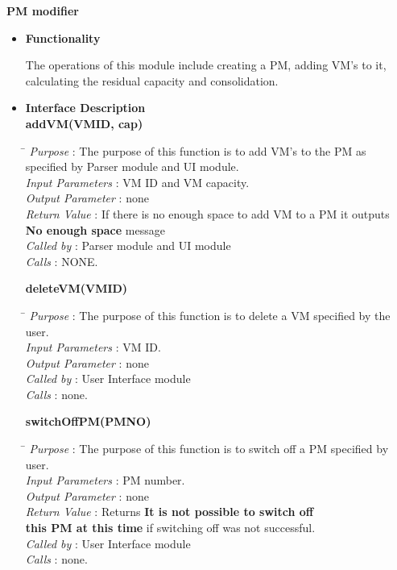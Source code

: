 \documentclass[a4paper,11pt]{article}
\begin{document}
\textbf{PM modifier}

\begin{itemize}
\item \textbf{Functionality}

The operations of this module include creating a PM, adding VM's to it, calculating the residual capacity and consolidation.

\item \textbf{Interface Description} 
\\
\textbf{addVM(VM\textunderscore ID, cap)}
  
\begin{tabbing}
\hspace*{4cm}\=  \kill
 \textit{Purpose} \> : The purpose of this function is to add VM's to the PM as \\ \>specified by Parser module and UI module.\\
  \textit{Input Parameters} \> : VM ID and VM capacity. \\
  \textit{Output Parameter} \> : none \\
  \textit{Return Value} \> : If there is no enough space to add VM to a PM it outputs \\ \>\textbf{No enough space} message\\
  \textit{Called by} \> : Parser module and UI module\\
  \textit{Calls} \> : NONE.
\end{tabbing}

\textbf{deleteVM(VM\textunderscore ID)}
  
\begin{tabbing}
\hspace*{4cm}\=  \kill
 \textit{Purpose} \> : The purpose of this function is to delete a VM specified by the user.\\
  \textit{Input Parameters} \> : VM ID. \\
  \textit{Output Parameter} \> : none \\
 \textit{Called by} \> : User Interface module \\
  \textit{Calls} \> : none.
\end{tabbing}

\textbf{switchOffPM(PM\textunderscore NO)}
  
\begin{tabbing}
\hspace*{4cm}\=  \kill
 \textit{Purpose} \> : The purpose of this function is to switch off a PM specified by user.\\
  \textit{Input Parameters} \> : PM number. \\
  \textit{Output Parameter} \> : none \\
  \textit{Return Value} \> : Returns \textbf{It is not possible to switch off}\\ \> \textbf{this PM at this time} if switching off was not successful. \\
  \textit{Called by} \> : User Interface module \\
  \textit{Calls} \> : none.
\end{tabbing}


\end{itemize}
\end{document}
